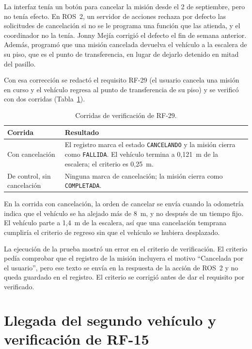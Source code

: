 \documentclass[12pt,letterpaper]{article}
\begin{document}
La interfaz tenía un botón para cancelar la misión desde el 2 de septiembre, pero no tenía efecto. En ROS~2, un servidor de acciones rechaza por defecto las solicitudes de cancelación si no se le programa una función que las atienda, y el coordinador no la tenía. Jonny Mejía corrigió el defecto el fin de semana anterior. Además, programó que una misión cancelada devuelva el vehículo a la escalera de su piso, que es el punto de transferencia, en lugar de dejarlo detenido en mitad del pasillo.

Con esa corrección se redactó el requisito RF-29 (el usuario cancela una misión en curso y el vehículo regresa al punto de transferencia de su piso) y se verificó con dos corridas (Tabla~\ref{tab:rf29}).

\begin{table}[H]
    \centering
    \small
    \caption{Corridas de verificación de RF-29.}
    \label{tab:rf29}
    \begin{tabular}{@{}p{3.6cm}p{10.4cm}@{}}
        \toprule
        \textbf{Corrida} & \textbf{Resultado} \\ \midrule
        Con cancelación & El registro marca el estado \texttt{CANCELANDO} y la misión cierra como \texttt{FALLIDA}. El vehículo termina a 0,121~m de la escalera; el criterio es 0,25~m. \\ \addlinespace
        De control, sin cancelación & Ninguna marca de cancelación; la misión cierra como \texttt{COMPLETADA}. \\ \bottomrule
    \end{tabular}
\end{table}

En la corrida con cancelación, la orden de cancelar se envía cuando la odometría indica que el vehículo se ha alejado más de 8~m, y no después de un tiempo fijo. El vehículo parte a 1,4~m de la escalera, así que una cancelación temprana cumpliría el criterio de regreso sin que el vehículo se hubiera desplazado.

La ejecución de la prueba mostró un error en el criterio de verificación. El criterio pedía comprobar que el registro de la misión incluyera el motivo ``Cancelada por el usuario'', pero ese texto se envía en la respuesta de la acción de ROS~2 y no queda guardado en el registro. El criterio se corrigió antes de dar el requisito por verificado.

\section{Llegada del segundo vehículo y verificación de RF-15}
\label{sec:red}
\end{document}
